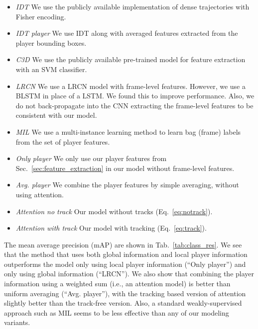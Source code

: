 \begin{itemize}\denselist
  \item \emph{IDT\cite{Wang_CVPR11}} We use the publicly available implementation of dense trajectories with
  Fisher encoding.
  
  \item \emph{IDT\cite{Wang_CVPR11} player} We use IDT along with averaged features extracted from the player
  bounding boxes.

  \item \emph{C3D \cite{Tran_arxiv14}} We use the publicly available pre-trained model for feature extraction
  with an SVM classifier.

  \item \emph{LRCN \cite{Donahue_arxiv14}} We use a LRCN model with frame-level features. However, we use
    a BLSTM in place of a LSTM. We found this to improve performance. Also, we do not back-propagate
    into the CNN extracting the frame-level features to be consistent with our model.

  \item \emph{MIL \cite{Andrews_NIPS02}} We use a multi-instance learning
    method to learn bag (frame) labels from the set of player features.

\item \emph{Only player} We only use our player features from Sec.~\ref{sec:feature_extraction} in our model
  without frame-level features.
 
  \item \emph{Avg. player} We combine the player features by simple averaging, without
using  attention.

  \item \emph{Attention no track} Our model without tracks (Eq.~\ref{eq:notrack}).

  \item \emph{Attention with track} Our model with tracking (Eq.~\ref{eq:track}).
\end{itemize}

The mean average precision (mAP) are shown in Tab.~\ref{tab:class_res}. We see
that the method that uses both global information and local player information
outperforms the model only using local player information (``Only player'') and only
using global information (``LRCN'').  We also show that combining the player
information using a weighted sum (i.e., an attention model) is better than
uniform averaging (``Avg. player''), with the tracking based version of
attention slightly better than the track-free version.  Also, a standard
weakly-supervised approach such as MIL seems to be less effective than any of
our modeling variants.

